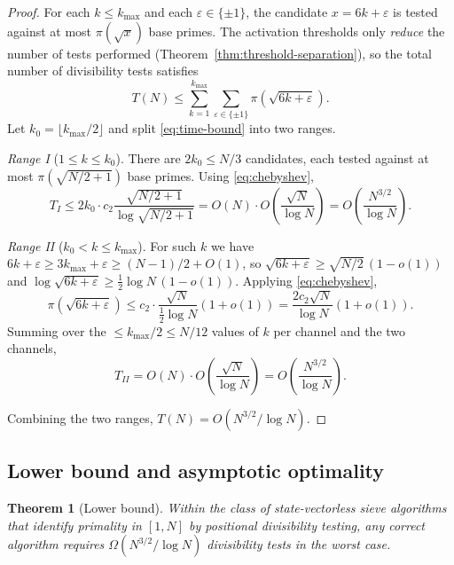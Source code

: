 \documentclass[11pt]{amsart}
\numberwithin{equation}{section}
\theoremstyle{plain}
\newtheorem{theorem}{Theorem}[section]
\theoremstyle{definition}
\begin{document}
\begin{proof}
For each $k\le k_{\max}$ and each $\varepsilon\in\{\pm 1\}$, the
candidate $x=6k+\varepsilon$ is tested against at most $\pi(\sqrt{x})$
base primes. The activation thresholds only \emph{reduce} the number
of tests performed (Theorem~\ref{thm:threshold-separation}), so the
total number of divisibility tests satisfies
\begin{equation}
T(N)\le\sum_{k=1}^{k_{\max}}\sum_{\varepsilon\in\{\pm 1\}}
\pi(\sqrt{6k+\varepsilon}).
\label{eq:time-bound}
\end{equation}
Let $k_0=\lfloor k_{\max}/2\rfloor$ and split \eqref{eq:time-bound}
into two ranges.

\emph{Range I} ($1\le k\le k_0$). There are $2k_0\le N/3$ candidates,
each tested against at most $\pi(\sqrt{N/2+1})$ base primes. Using
\eqref{eq:chebyshev},
\begin{equation*}
T_I\le 2k_0\cdot c_2\frac{\sqrt{N/2+1}}{\log\sqrt{N/2+1}}
=O(N)\cdot O\!\left(\frac{\sqrt{N}}{\log N}\right)
=O\!\left(\frac{N^{3/2}}{\log N}\right).
\end{equation*}

\emph{Range II} ($k_0<k\le k_{\max}$). For such $k$ we have
$6k+\varepsilon\ge 3k_{\max}+\varepsilon\ge (N-1)/2+O(1)$, so
$\sqrt{6k+\varepsilon}\ge\sqrt{N/2}\,(1-o(1))$ and
$\log\sqrt{6k+\varepsilon}\ge\tfrac12\log N\,(1-o(1))$. Applying
\eqref{eq:chebyshev},
\begin{equation*}
\pi(\sqrt{6k+\varepsilon})\le
c_2\cdot\frac{\sqrt{N}}{\tfrac12\log N}(1+o(1))
=\frac{2c_2\sqrt{N}}{\log N}(1+o(1)).
\end{equation*}
Summing over the $\le k_{\max}/2\le N/12$ values of $k$ per channel and
the two channels,
\begin{equation*}
T_{II}=O(N)\cdot O\!\left(\frac{\sqrt{N}}{\log N}\right)
=O\!\left(\frac{N^{3/2}}{\log N}\right).
\end{equation*}

Combining the two ranges, $T(N)=O(N^{3/2}/\log N)$.
\end{proof}

\subsection{Lower bound and asymptotic optimality}
\label{subsec:complexity-lower}

\begin{theorem}[Lower bound]
\label{thm:lower_bound}
Within the class of state-vectorless sieve algorithms that identify
primality in $[1,N]$ by positional divisibility testing, any correct
algorithm requires $\Omega(N^{3/2}/\log N)$ divisibility tests in the
worst case.
\end{theorem}
\end{document}
